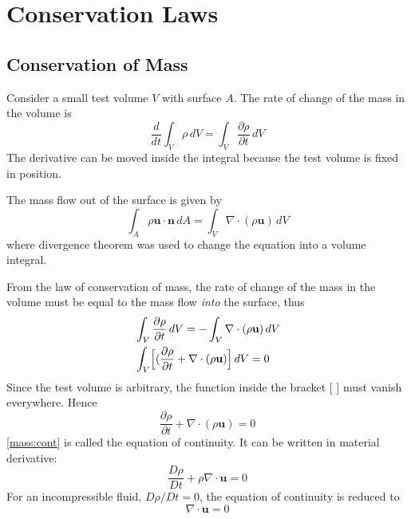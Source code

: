\section{Conservation Laws}
\subsection{Conservation of Mass}
Consider a small test volume $V$
with surface $A$. The rate of change of the mass in the volume is
\begin{equation}\label{mass:rate}
    \frac{d}{dt}\int_V\rho\,dV =
    \int_V\frac{\partial\rho}{\partial t}\,dV
\end{equation}
The derivative can be moved inside the integral because the test
volume is fixed in position.

The mass flow out of the surface is given by
\begin{equation}
    \int_A\rho\mathbf{u}\cdot\mathbf{n}\,dA =
    \int_V\nabla\cdot(\rho\mathbf{u})\,dV
\end{equation}
where divergence theorem was used to change the equation into a
volume integral.

From the law of conservation of mass, the rate of change of the mass
in the volume must be equal to the mass flow \emph{into} the
surface, thus
\begin{align}
    &\int_V\frac{\partial\rho}{\partial t}\,dV =
    -\int_V\nabla\cdot(\rho\mathbf{u})\,dV\notag\\
    &\int_V\Bigl[(\frac{\partial\rho}{\partial t}+\nabla\cdot(\rho\mathbf{u})\Bigr]\,dV = 0\label{mass:con}
\end{align}
Since the test volume is arbitrary, the function inside the bracket
[ ] must vanish everywhere. Hence
\begin{equation}\label{mass:cont}
\boxed{\frac{\partial\rho}{\partial t}+\nabla\cdot(\rho\mathbf{u}) =
0}
\end{equation}
\eqref{mass:cont} is called the equation of continuity. It can be
written in material derivative:
\begin{equation}\label{mass:cont2}
\frac{D\rho}{Dt}+\rho\nabla\cdot\mathbf{u} = 0
\end{equation}
For an incompressible fluid, $D\rho/Dt=0$, the equation of
continuity is reduced to
\begin{equation}\label{mass:cont3}
\nabla\cdot\mathbf{u} = 0
\end{equation}
